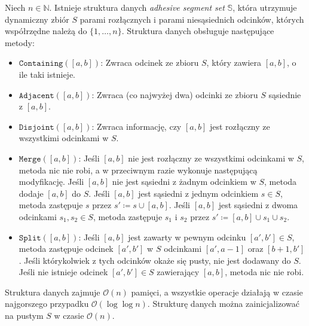 \documentclass[runningheads]{llncs}
\newcommand{\Oh}{\mathcal{O}}
\begin{document}
\begin{lemma}\label{lem:segment_tree}
Niech $n \in \mathbb{N}$. Istnieje struktura danych \emph{adhesive segment set}
$\mathbb{S}$, która
utrzymuje
dynamiczny zbiór $S$
parami rozłącznych i parami niesąsiednich odcinków,
których współrzędne należą do $\{ 1, \ldots, n \}$.
Struktura danych obsługuje
następujące metody:
\begin{itemize}
	\item $\mathtt{Containing}([a,b])$: Zwraca odcinek
	ze zbioru $S$, który zawiera
	$[a,b]$, o ile taki istnieje. 
	\item $\mathtt{Adjacent}([a,b])$: Zwraca (co najwyżej dwa)
	odcinki ze zbioru $S$
	sąsiednie z $[a,b]$.
	\item $\mathtt{Disjoint}([a,b])$: Zwraca informację, czy $[a,b]$ jest rozłączny ze wszystkimi odcinkami w $S$.
\item $\mathtt{Merge}([a,b])$: Jeśli $[a,b]$ nie jest rozłączny ze wszystkimi odcinkami w $S$, metoda nic nie robi, a w przeciwnym razie wykonuje następującą modyfikację. Jeśli $[a,b]$ nie jest sąsiedni z żadnym odcinkiem w $S$, metoda dodaje $[a,b]$ do $S$. Jeśli $[a,b]$ jest sąsiedni z jednym odcinkiem $s\in S$, metoda zastępuje $s$ przez $s'\coloneqq s\cup [a,b]$. Jeśli $[a,b]$ jest sąsiedni z dwoma odcinkami $s_1,s_2\in S$, metoda zastępuje $s_1$ i $s_2$ przez $s'\coloneqq [a,b] \cup s_1 \cup s_2$.
\item $\mathtt{Split}([a,b])$: Jeśli $[a,b]$
 jest zawarty
 w pewnym odcinku $[a',b'] \in S$, metoda
 zastępuje odcinek $[a',b']$ w
 $S$ odcinkami $[a',a-1]$ oraz $[b+1,b']$. Jeśli którykolwiek z tych odcinków okaże się pusty, nie jest dodawany do $S$. Jeśli nie istnieje odcinek $[a',b']\in S$ zawierający $[a,b]$, metoda nic nie robi.
\end{itemize}
Struktura danych zajmuje $\Oh(n)$ pamięci, a wszystkie operacje
działają w czasie najgorszego przypadku $\Oh(\log \log n)$. Strukturę danych można zainicjalizować na pustym $S$ w czasie $\Oh(n)$.
\end{lemma}
\end{document}
